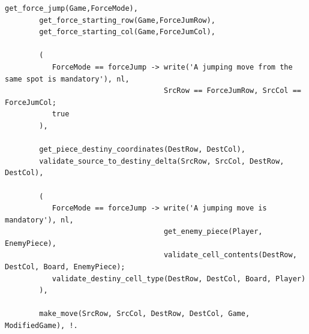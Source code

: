 \documentclass[a4paper]{article}
\begin{document}
\begin{lstlisting}[style=customprologwithlines]
        get_force_jump(Game,ForceMode),
        get_force_starting_row(Game,ForceJumRow),
        get_force_starting_col(Game,ForceJumCol),

        (
           ForceMode == forceJump -> write('A jumping move from the same spot is mandatory'), nl,
                                     SrcRow == ForceJumRow, SrcCol == ForceJumCol;
           true
        ),

        get_piece_destiny_coordinates(DestRow, DestCol), 
        validate_source_to_destiny_delta(SrcRow, SrcCol, DestRow, DestCol),

        (
           ForceMode == forceJump -> write('A jumping move is mandatory'), nl,
                                     get_enemy_piece(Player, EnemyPiece),
                                     validate_cell_contents(DestRow, DestCol, Board, EnemyPiece);
           validate_destiny_cell_type(DestRow, DestCol, Board, Player)
        ),

        make_move(SrcRow, SrcCol, DestRow, DestCol, Game, ModifiedGame), !.
\end{lstlisting}
\end{document}
